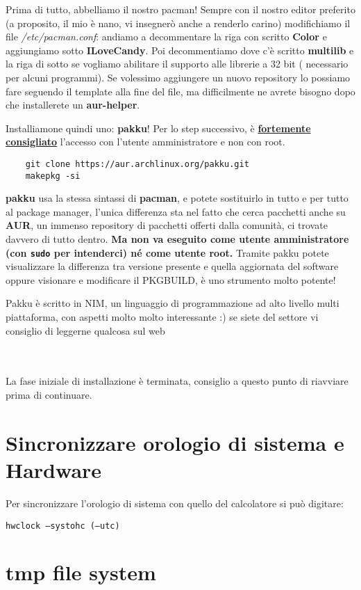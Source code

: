 \documentclass[twoside,italian]{book}
\newcommand{\nlinea}{
	\leavevmode
	\\
}
\newcommand{\centcode}[1]{
	
	\definecolor{centcode}{rgb}{0.5,0.1,0.1}
	
	\begin{center}
	 	\texttt{\textcolor{centcode}{#1}}
	\end{center}
	
	
}
\newcommand{\code}[1]{
	\texttt{\textcolor{code}{#1}}
}
\begin{document}
			Prima di tutto, abbelliamo il nostro pacman!
			Sempre con il nostro editor preferito (a proposito, il mio è nano, vi insegnerò anche a renderlo carino) modifichiamo il file \textit{/etc/pacman.conf}: andiamo a decommentare la riga con scritto \textbf{Color} e aggiungiamo sotto \textbf{ILoveCandy}.
			Poi decommentiamo dove c'è scritto \textbf{multilib} e la riga di sotto se vogliamo abilitare il supporto alle librerie a 32 bit ( necessario per alcuni programmi).
			Se volessimo aggiungere un nuovo repository lo possiamo fare seguendo il template alla fine del file, ma difficilmente ne avrete bisogno dopo che installerete un \textbf{aur-helper}.

			Installiamone quindi uno: \textbf{pakku}!
			Per lo step successivo, è \underline{\textbf{fortemente consigliato}} l'accesso con l'utente amministratore e non con root.

\begin{lstlisting}
	git clone https://aur.archlinux.org/pakku.git
	makepkg -si
\end{lstlisting}

			\textbf{pakku} usa la stessa sintassi di \textbf{pacman}, e potete sostituirlo in tutto e per tutto al package manager, l'unica differenza sta nel fatto che cerca pacchetti anche su \textbf{AUR}, un immenso repository di pacchetti offerti dalla comunità, ci trovate davvero di tutto dentro. \textbf{Ma non va eseguito come utente amministratore (con \code{sudo} per intenderci) né come utente root.}
			Tramite pakku potete visualizzare la differenza tra versione presente e quella aggiornata del software oppure visionare e modificare il PKGBUILD, è uno strumento molto potente!
			
			Pakku è scritto in NIM, un linguaggio di programmazione ad alto livello multi piattaforma, con aspetti molto molto interessante :) se siete del settore vi consiglio di leggerne qualcosa sul web
\nlinea
	\nlinea
			La fase iniziale di installazione è terminata, consiglio a questo punto di riavviare prima di continuare.
			
			
		\section{Sincronizzare orologio di sistema e Hardware}
			
			Per sincronizzare l'orologio di sistema con quello del calcolatore si può digitare:\centcode{hwclock --systohc (--utc)}
			
		\section{tmp file system}
			
\end{document}
